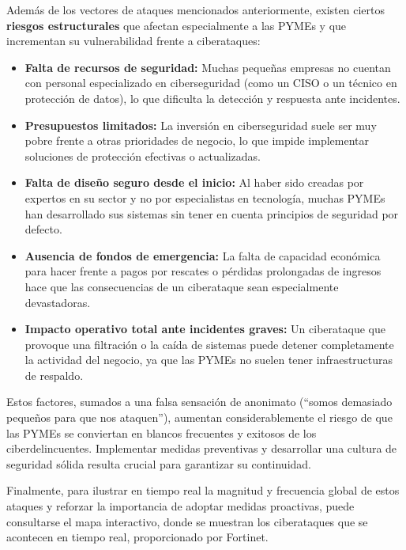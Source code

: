 \documentclass[a4paper, 10pt]{article}
\begin{document}
\par\vspace{0.5cm}
Además de los vectores de ataques mencionados anteriormente, existen ciertos \textbf{riesgos estructurales} que afectan especialmente a las PYMEs y que incrementan su vulnerabilidad frente a ciberataques:

\begin{itemize}
  \item \textbf{Falta de recursos de seguridad:} Muchas pequeñas empresas no cuentan con personal especializado en ciberseguridad (como un CISO o un técnico en protección de datos), lo que dificulta la detección y respuesta ante incidentes.
  \item \textbf{Presupuestos limitados:} La inversión en ciberseguridad suele ser muy pobre frente a otras prioridades de negocio, lo que impide implementar soluciones de protección efectivas o actualizadas.
  \item \textbf{Falta de diseño seguro desde el inicio:} Al haber sido creadas por expertos en su sector y no por especialistas en tecnología, muchas PYMEs han desarrollado sus sistemas sin tener en cuenta principios de seguridad por defecto.
  \item \textbf{Ausencia de fondos de emergencia:} La falta de capacidad económica para hacer frente a pagos por rescates o pérdidas prolongadas de ingresos hace que las consecuencias de un ciberataque sean especialmente devastadoras.
  \item \textbf{Impacto operativo total ante incidentes graves:} Un ciberataque que provoque una filtración o la caída de sistemas puede detener completamente la actividad del negocio, ya que las PYMEs no suelen tener infraestructuras de respaldo.
\end{itemize}

\par\vspace{0.5cm}
Estos factores, sumados a una falsa sensación de anonimato (“somos demasiado pequeños para que nos ataquen”), aumentan considerablemente el riesgo de que las PYMEs se conviertan en blancos frecuentes y exitosos de los ciberdelincuentes. 
Implementar medidas preventivas y desarrollar una cultura de seguridad sólida resulta crucial para garantizar su continuidad. \cite{toms2021}
\par\vspace{0.5cm}

Finalmente, para ilustrar en tiempo real la magnitud y frecuencia global de estos ataques y reforzar la importancia de adoptar medidas proactivas, puede consultarse el mapa 
interactivo, donde se muestran los ciberataques que se acontecen en tiempo real, proporcionado por Fortinet. 
\end{document}
